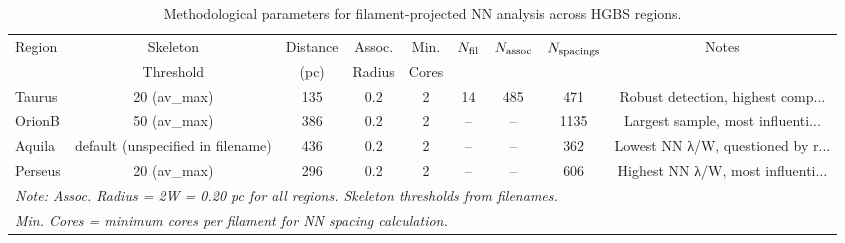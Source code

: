\begin{table}[htbp]
\centering
\caption{Methodological parameters for filament-projected NN analysis across HGBS regions.}
\label{tab:nn_methodology}
\begin{tabular}{lcccccccc}
\hline
Region & Skeleton & Distance & Assoc. & Min. & $N_{\rm fil}$ & $N_{\rm assoc}$ & $N_{\rm spacings}$ & Notes \\
 & Threshold & (pc) & Radius & Cores &  &  &  &  \\
\hline
Taurus & 20 (av_max) & 135 & 0.2 & 2 & 14 & 485 & 471 & Robust detection, highest comp... \\
OrionB & 50 (av_max) & 386 & 0.2 & 2 & -- & -- & 1135 & Largest sample, most influenti... \\
Aquila & default (unspecified in filename) & 436 & 0.2 & 2 & -- & -- & 362 & Lowest NN λ/W, questioned by r... \\
Perseus & 20 (av_max) & 296 & 0.2 & 2 & -- & -- & 606 & Highest NN λ/W, most influenti... \\
\hline
\multicolumn{9}{l}{\textit{Note: Assoc. Radius = 2W = 0.20 pc for all regions. Skeleton thresholds from filenames.}} \\
\multicolumn{9}{l}{\textit{Min. Cores = minimum cores per filament for NN spacing calculation.}} \\
\end{tabular}
\end{table}